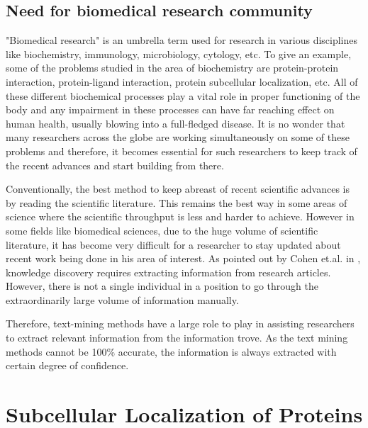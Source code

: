 \subsection*{Need for biomedical research community}

"Biomedical research" is an umbrella term used for research in various disciplines like biochemistry, immunology, microbiology, cytology, etc. To give an example, some of the problems studied in the area of biochemistry are protein-protein interaction, protein-ligand interaction, protein subcellular localization, etc. All of these different biochemical processes play a vital role in proper functioning of the body and any impairment in these processes can have far reaching effect on human health, usually blowing into a full-fledged disease. It is no wonder that many researchers across the globe are working simultaneously on some of these problems and therefore, it becomes essential for such researchers to keep track of the recent advances and start building from there. 

Conventionally, the best method to keep abreast of recent scientific advances is by reading the scientific literature. This remains the best way in some areas of science where the scientific throughput is less and harder to achieve. However in some fields like biomedical sciences, due to the huge volume of scientific literature, it has become very difficult for a researcher to stay updated about recent work being done in his area of interest. As pointed out by Cohen et.al. in \cite{cohen2005survey}, knowledge discovery requires extracting information from research articles. However, there is not a single individual in a position to go through the extraordinarily large volume of information manually.

Therefore, text-mining methods have a large role to play in assisting researchers to extract relevant information from the information trove. As the text mining methods cannot be 100\% accurate, the information is always extracted with certain degree of confidence.

\section{Subcellular Localization of Proteins}

